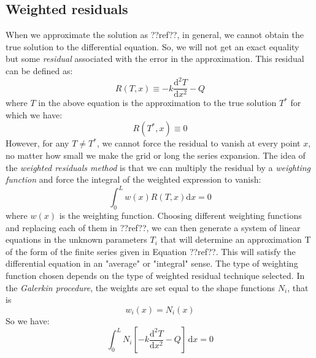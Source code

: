 \documentclass[a4paper,12pt]{article} %
\begin{document}
\subsection{Weighted residuals}

When we approximate the solution as ??ref??, in general, we cannot obtain the true
solution to the differential equation. So, we will not get an exact equality but
some \textit{residual} associated with the error in the approximation. This residual
can be defined as:
\begin{equation}
R(T,x) \equiv -k \frac{\mathrm{d}^2 T}{\mathrm{d}x^2} - Q
\end{equation}
where $T$ in the above equation is the approximation to the true solution $T^{*}$
for which we have:
\begin{equation}
R(T^{*},x) \equiv 0
\end{equation}
However, for any $T \neq T^{\mathrm{*}}$, we cannot force the residual
to vanish at every
point $x$, no matter how small we make the grid or long the series expansion.
The idea of the \textit{weighted residuals method} is that we can multiply
the residual by a \textit{weighting function} and force the integral of the weighted
expression to vanish:
\begin{equation}
\int_{0}^{L} w(x) R(T,x) \mathrm{d}x = 0
\end{equation}
where $w(x)$ is the weighting function.
Choosing different weighting functions and replacing each of them in
??ref??, we can then generate a system
of linear equations in the unknown parameters $T_{i}$ that will determine an
approximation T of the form of the finite series given in Equation ??ref??.
This will satisfy the differential equation in an "average" or "integral" sense.
The type of weighting function chosen depends on the type of weighted
residual technique selected. In the \textit{Galerkin procedure}, the weights are set
equal to the shape functions $N_{i}$, that is
\begin{equation}
w_{i}(x) = N_{i}(x)
\end{equation}
So we have:
\begin{equation}
\int_{0}^{L} N_{i} \left[
-k\frac{\mathrm{d}^2 T}{\mathrm{d}x^2} - Q
\right]\,\mathrm{d}x = 0
\end{equation}
\end{document}
